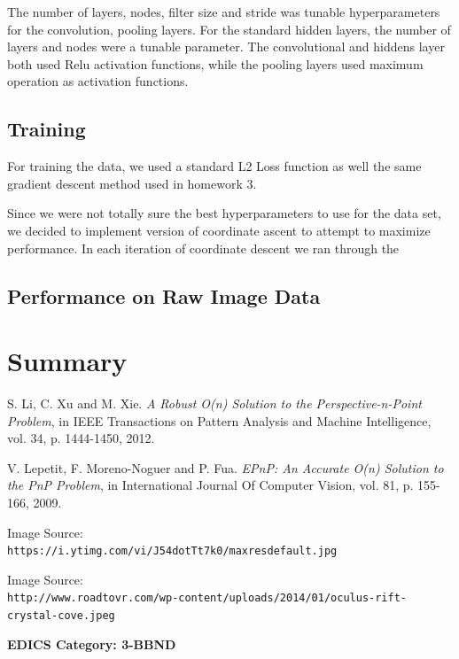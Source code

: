 \documentclass[journal]{IEEEtran}
\begin{document}
The number of layers, nodes, filter size and stride was tunable hyperparameters for the convolution, pooling layers. For the standard hidden layers, the number of layers and nodes were a tunable parameter. The convolutional and hiddens layer both used Relu activation functions, while the pooling layers used maximum operation as activation functions. 



\subsection{Training}
For training the data, we used a standard L2 Loss function as well the same gradient descent method used in homework 3. 

Since we were not totally sure the best hyperparameters to use for the data set, we decided to implement version of coordinate ascent to attempt to maximize performance. 
In each iteration of coordinate descent we ran through the 

\subsection{Performance on Raw Image Data}


\section{Summary}


\begin{thebibliography}{10}
	
	S. Li, C. Xu and M. Xie. \textit{A Robust O(n) Solution to the Perspective-n-Point Problem}, in IEEE Transactions on Pattern Analysis and Machine Intelligence, vol. 34, p. 1444-1450, 2012.
	
	V. Lepetit, F. Moreno-Noguer and P. Fua. \textit{EPnP: An Accurate O(n) Solution to the PnP Problem}, in International Journal Of Computer Vision, vol. 81, p. 155-166, 2009.
	
	Image Source: \\\texttt{https://i.ytimg.com/vi/J54dotTt7k0/maxresdefault.jpg}
	
	
	Image Source: \\\texttt{http://www.roadtovr.com/wp-content/uploads/2014/01/oculus-rift-crystal-cove.jpeg}
\end{thebibliography}

 \ifCLASSOPTIONpeerreview
 \begin{center} \bfseries EDICS Category: 3-BBND \end{center}
 \fi



\IEEEpeerreviewmaketitle




   
\end{document}
